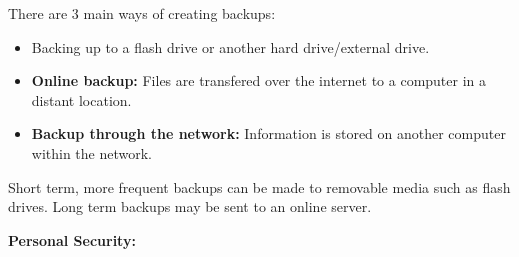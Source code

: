\documentclass{report}
\begin{document}
    \bigbreak \noindent 
    There are 3 main ways of creating backups:

    \bigbreak \noindent 
    \begin{itemize}
        \item Backing up to a flash drive or another hard drive/external drive.
        \item \textbf{Online backup:} Files are transfered over the internet to a computer in a distant location.
        \item \textbf{Backup through the network:} Information is stored on another computer within the network.
    \end{itemize}

    \bigbreak \noindent 
    Short term, more frequent backups can be made to removable media such as flash drives.
    Long term backups may be sent to an online server.
    
    \bigbreak \noindent 
    \begin{Large}
        \textbf{Personal Security:}
    \end{Large}

    \bigbreak \noindent 
\end{document}
